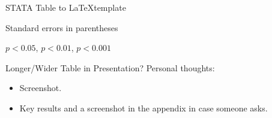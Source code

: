 \begin{frame}[fragile]{STATA Table to \LaTeX template}
\begin{threeparttable}
    \begin{tablenotes}[flushleft]
        \item \footnotesize Standard errors in parentheses
        \item \footnotesize \sym{*} \(p<0.05\), \sym{**} \(p<0.01\), \sym{***} \(p<0.001\)
    \end{tablenotes}
\end{threeparttable}
\end{frame}


\begin{frame}{Longer/Wider Table in Presentation?}
Personal thoughts:
\begin{itemize}
    \item Screenshot.
    \item Key results and a screenshot in the appendix in case someone asks.
\end{itemize}


\end{frame}